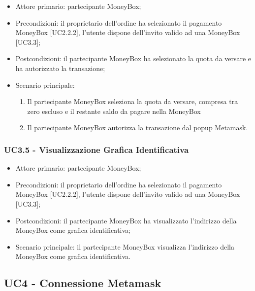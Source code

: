 \begin{itemize}
    \item Attore primario: partecipante MoneyBox\glo{};
    \item Precondizioni: il proprietario dell'ordine ha selezionato il pagamento MoneyBox\glo{} [UC2.2.2], 
            l'utente dispone dell'invito valido ad una MoneyBox\glo{} [UC3.3];
    \item Postcondizioni: il partecipante MoneyBox\glo{} ha selezionato la quota da versare e ha autorizzato la transazione;
    \item Scenario principale:
        \begin{enumerate}
            \item Il partecipante MoneyBox\glo{} seleziona la quota da versare, compresa tra zero escluso e il restante saldo da pagare nella MoneyBox\glo{}
            \item Il partecipante MoneyBox\glo{} autorizza la transazione dal popup Metamask\glo{}.
        \end{enumerate}
\end{itemize}

\subsubsection{UC3.5 - Visualizzazione Grafica Identificativa}

\begin{itemize}
    \item Attore primario: partecipante MoneyBox\glo{};
    \item Precondizioni: il proprietario dell'ordine ha selezionato il pagamento MoneyBox\glo{} [UC2.2.2], 
            l'utente dispone dell'invito valido ad una MoneyBox\glo{} [UC3.3];
    \item Postcondizioni: il partecipante MoneyBox\glo{} ha visualizzato l'indirizzo della MoneyBox\glo{} come grafica identificativa;
    \item Scenario principale: il partecipante MoneyBox\glo{} visualizza l'indirizzo della MoneyBox\glo{} come grafica identificativa.
\end{itemize}

\subsection{UC4 - Connessione Metamask}\label{subsection: U4}


